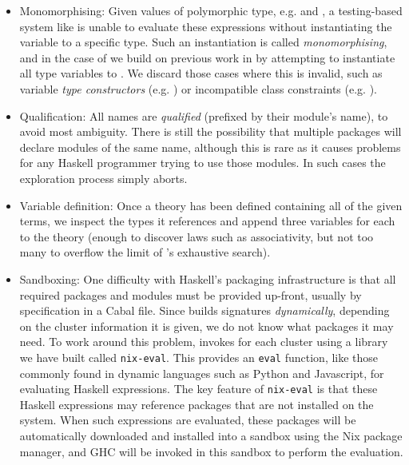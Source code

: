 \begin{itemize}
\item{Monomorphising}: Given values of polymorphic type, e.g.  and , a testing-based
  system like \quickspec{} is unable to evaluate these expressions without
  instantiating the variable  to a specific type. Such an instantiation is
  called \emph{monomorphising}, and in the case of \mlspec{} we build on
  previous work in \quickcheck{} by attempting to instantiate all type variables to
  . We discard those cases where this is invalid, such as variable
  \emph{type constructors} (e.g. ) or
  incompatible class constraints (e.g. ).

\item{Qualification}: All names are \emph{qualified} (prefixed by their module's
  name), to avoid most ambiguity. There is still the possibility that multiple
  packages will declare modules of the same name, although this is rare as it
  causes problems for any Haskell programmer trying to use those modules. In
  such cases the exploration process simply aborts.

\item{Variable definition}: Once a \quickspec{} theory has been defined containing
  all of the given terms, we inspect the types it references and append three
  variables for each to the theory (enough to discover laws such as
  associativity, but not too many to overflow the limit of \quickspec{}'s exhaustive
  search).

\item{Sandboxing}: One difficulty with Haskell's packaging infrastructure is
  that all required packages and modules must be provided up-front, usually by
  specification in a Cabal file. Since \mlspec{} builds signatures
  \emph{dynamically}, depending on the cluster information it is given, we do
  not know what packages it may need. To work around this problem,
  \mlspec{} invokes \quickspec{} for each cluster using a library we have
  built called \texttt{nix-eval}. This provides an \texttt{eval} function, like
  those commonly found in dynamic languages such as Python and Javascript, for
  evaluating Haskell expressions. The key feature of \texttt{nix-eval} is that
  these Haskell expressions may reference packages that are not installed on the
  system. When such expressions are evaluated, these packages will be
  automatically downloaded and installed into a sandbox using the Nix package
  manager, and GHC will be invoked in this sandbox to perform the evaluation.
\end{itemize}

